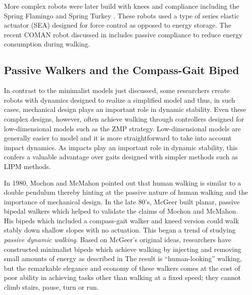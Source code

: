 More complex robots were later build with knees and compliance including the
Spring Flamingo and Spring Turkey \cite{Hollerbach1992, Pratt1999, Pratt2000,
  Pratt2001}.
%
These robots used a type of series elastic actuator (SEA) designed for force
control as opposed to energy storage.
%
The recent COMAN robot discussed in \cite{Li2013} includes passive
compliance to reduce energy consumption during walking.


\subsection{Passive Walkers and the Compass-Gait Biped} \label{sec:literature-passive-walkers}

In contrast to the minimalist models just discussed, some researchers create
robots with dynamics designed to realize a simplified model and thus, in such
cases, mechanical design plays an important role in dynamic stability.
%
Even these complex designs, however, often achieve walking through controllers
designed for low-dimensional models such as the ZMP strategy.
%
Low-dimensional models are generally easier to model and it is more straightforward
to take into account impact dynamics.
%
As impacts play an important role in dynamic stability, this confers a valuable
advantage over gaits designed with simpler methods such as LIPM methods.
%

In 1980, Mochon and McMahon \cite{Mochon1980} pointed out that human walking is
similar to a double pendulum thereby hinting at the passive nature of human
walking and the importance of mechanical design.
%
In the late 80's, McGeer built planar, passive bipedal walkers which helped to
validate the claims of Mochon and McMahon.
%
His bipeds which included a compass-gait walker \cite{McGeer1990} and kneed version \cite{McGeer1990a} could walk stably down shallow slopes with no actuation.
%
This began a trend of studying {\em passive dynamic walking}.
%
Based on McGeer's original ideas, researchers have constructed minimalist bipeds
which achieve walking by injecting and removing small amounts of energy as described in \cite{Collins2005}
%
The result is ``human-looking'' walking, but the remarkable elegance and
economy of these walkers comes at the cost of poor ability in achieving tasks
other than walking at a fixed speed;
%
they cannot climb stairs, pause, turn or run.
%


